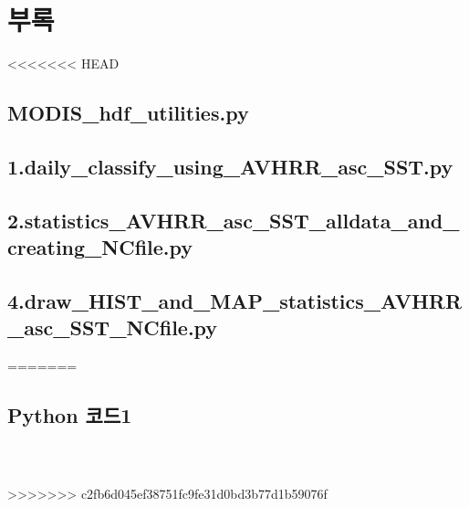 
\section{부록}

<<<<<<< HEAD
\subsection{MODIS\_hdf\_utilities.py}




\subsection{1.daily\_classify\_using\_AVHRR\_asc\_SST.py}


\subsection{2.statistics\_AVHRR\_asc\_SST\_alldata\_and\_creating\_NCfile.py}


\subsection{4.draw\_HIST\_and\_MAP\_statistics\_AVHRR\_asc\_SST\_NCfile.py}

=======
\subsection{Python 코드1}




\begin{lstlisting}[language=python]
	
	
\end{lstlisting}
>>>>>>> c2fb6d045ef38751fc9fe31d0bd3b77d1b59076f
